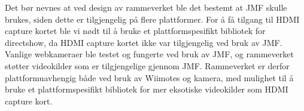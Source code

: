 \documentclass{report}
\begin{document}
Det bør nevnes at ved design av rammeverket ble det bestemt at JMF skulle brukes, siden dette er tilgjengelig på flere plattformer.
For å få tilgang til HDMI capture kortet ble vi nødt til å bruke et plattformspesifikt bibliotek for directshow, da HDMI capture kortet ikke var tilgjengelig ved bruk av JMF. Vanlige webkameraer ble testet og fungerte ved bruk av JMF, og rammeverket støtter
videokilder som er tilgjengelige gjennom JMF.  Rammeverket er derfor plattformuavhengig både ved bruk av Wiimotes og kamera, med mulighet til
å bruke et plattformspesifikt bibliotek for mer eksotiske videokilder som HDMI capture kort.
\end{document}
